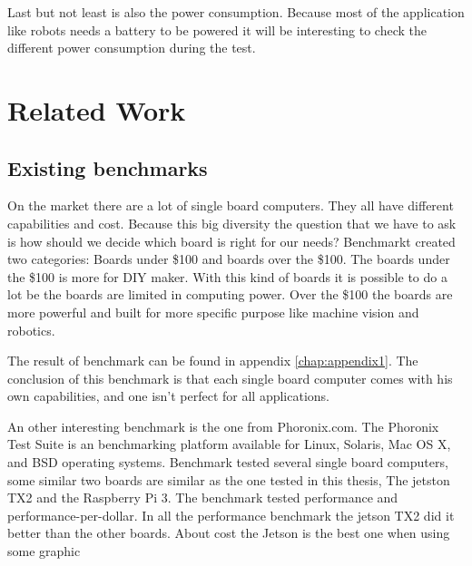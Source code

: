 \documentclass[english]{book_template} %
\begin{document}
Last but not least is also the power consumption. Because most of the application like robots needs a battery to be powered it will be interesting to check the different power consumption during the test. 


\chapter{Related Work}

\section{Existing benchmarks} \label{SBC}

On the market there are a lot of single board computers. They all have different capabilities and cost.\cite{Benchmar1:online} Because this big diversity the question that we have to ask is how should we decide which board is right for our needs?
Benchmarkt \cite{Benchmar1:online} created two categories: Boards under \$100 and boards over the \$100. The boards under the \$100 is more for DIY maker. With this kind of boards it is possible to do a lot be the boards are limited in computing power. Over the \$100 the boards are more powerful and built for more specific purpose like machine vision and robotics.\cite{Benchmar1:online}

The result of benchmark \cite{Benchmar1:online} can be found in  appendix \ref{chap:appendix1}. The conclusion of this benchmark is that each single board computer comes with his own capabilities, and one isn't perfect for all applications.

An other interesting benchmark is the one from Phoronix.com. The Phoronix Test Suite is an benchmarking platform available for
Linux, Solaris, Mac OS X, and BSD operating systems.  \cite{Phoronix88:online} Benchmark \cite{Benchmar96:online} tested several single board computers, some similar two boards are similar as the one tested in this thesis, The jetston TX2 and the Raspberry  Pi 3. 
The benchmark tested performance and performance-per-dollar. In all the performance benchmark the jetson TX2 did it better than the other boards. About cost the Jetson is the best one when using some graphic \cite{Benchmar96:online}
\end{document}

